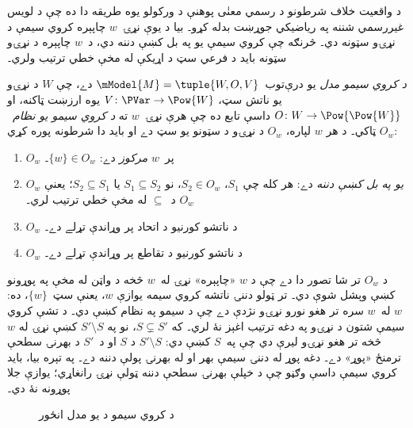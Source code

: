 \documentclass[../../../include/open-logic-section]{subfiles}
\begin{document}


د واقعيت خلاف شرطونو د رسمي معنٰی پوهنې د ورکولو يوه طريقه دا
ده چې د لويس غيررسمي شننه په رياضيکي جوړښت بدله کړو۔ بيا د
يوې نړۍ~$w$ چاپېره کروي سيمې د نړۍو سټونه دي۔ څرنګه چې
کروي سيمې يو په بل کښې دننه دي، د~$w$ چاپېره د نړۍو سټونه
بايد د فرعي سټ د اړيکې له مخې خطي ترتيب ولري۔

\begin{defn}
  \emph{د کروي سيمو مدل} يو درې‌توب~$\mModel{M} = \tuple{W, O, V}$
  دے، چې $W$ د نړۍو يو ناتش سټ، $V\colon \PVar \to \Pow{W}$
  يوه ارزښت ټاکنه، او $O\colon W \to \Pow{\Pow{W}}$ داسې تابع ده
  چې هرې نړۍ~$w$ ته \emph{د کروي سيمو يو نظام}~$O_w$ ټاکي۔
  د هر $w$ لپاره، $O_w$ د نړۍو د سټونو يو سټ دے او بايد دا شرطونه پوره کړي:
  \begin{enumerate}
  \item $O_w$ پر~$w$ \emph{مرکوز} دے: $\{w\} \in O_w$۔
  \item $O_w$ \emph{يو په بل کښې دننه} دے: هر کله چې $S_1$، $S_2 \in O_w$، نو $S_1
    \subseteq S_2$ يا $S_2 \subseteq S_1$؛ يعنې $O_w$ د~$\subseteq$
    له مخې خطي ترتيب لري۔
  \item $O_w$ د ناتشو کورنيو د اتحاد پر وړاندې تړلے دے۔
  \item $O_w$ د ناتشو کورنيو د تقاطع پر وړاندې تړلے دے۔
  \end{enumerate}
\end{defn}

د $O_w$ تر شا تصور دا دے چې د $w$ «چاپېره» نړۍ له~$w$ څخه
د واټن له مخې په پوړونو کښې وېشل شوې دي۔ تر ټولو دننۍ ناتشه
کروي سيمه يوازې $w$، يعنې سټ~$\{w\}$، ده: $w$ له~$w$ سره
تر هغو نورو نړۍو نژدې دے چې د سيمو په نظام کښې دي۔
د تشې کروي سيمې شتون د نړۍو په دغه ترتيب اغېز نۀ لري۔
که $S \subsetneq S'$، نو په $S' \setminus S$
کښې نړۍ له $w$ څخه تر هغو نړۍو ليرې دي چې په~$S$ کښې دي:
$S' \setminus S$ د $S$ او د~$S'$ د بهرنۍ سطحې ترمنځ «پوړ»
دے۔ دغه پوړ له دننۍ سيمې بهر او له بهرنۍ پولې دننه دے۔
په تېره بيا، بايد کروي سيمې داسې وګڼو چې د خپلې
بهرنۍ سطحې دننه ټولې نړۍ رانغاړي؛ يوازې جلا پوړونه نۀ دي۔

\begin{figure}
\begin{center}
\caption{د کروي سيمو د يو مدل انځور}
\end{center}
\end{figure}
\end{document}
